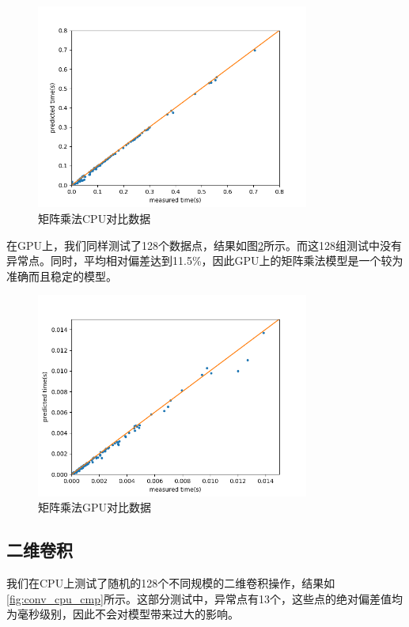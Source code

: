    \begin{figure}[!htbp]
        \centering
        \includegraphics[width=0.8\textwidth]{figures/matmul_cpu_cmp.png}
        \caption{矩阵乘法CPU对比数据}
        \label{fig:matmul_cpu_cmp}
    \end{figure}

    在GPU上，我们同样测试了128个数据点，结果如图\ref{fig:matmul_gpu_cmp}所示。而这128组测试中没有异常点。同时，平均相对偏差达到11.5\%，因此GPU上的矩阵乘法模型是一个较为准确而且稳定的模型。

    \begin{figure}[!htbp]
        \centering
        \includegraphics[width=0.8\textwidth]{figures/matmul_gpu_cmp.png}
        \caption{矩阵乘法GPU对比数据}
        \label{fig:matmul_gpu_cmp}
    \end{figure}

\subsection{二维卷积}
    我们在CPU上测试了随机的128个不同规模的二维卷积操作，结果如\ref{fig:conv_cpu_cmp}所示。这部分测试中，异常点有13个，这些点的绝对偏差值均为毫秒级别，因此不会对模型带来过大的影响。
    
